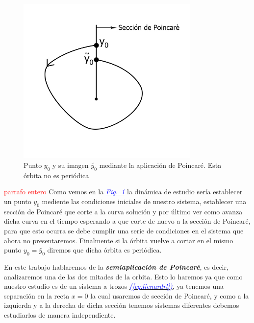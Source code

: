 \documentclass[12pt,a4paper]{report} %
\newcommand{\fref}[1]{\hyperref[#1]{\textcolor{blue}{\textit{Fig.~\ref*{#1}}}}}
\newcommand{\eref}[1]{\hyperref[#1]{\textcolor{blue}{\textit{(\ref*{#1})}}}}
\begin{document}
	\begin{figure}[h]
		\centering
		\includegraphics[width=0.8\textwidth]{aplipoincare2.jpg}
		\caption{Punto $y_0$ y su imagen $\tilde{y_0}$ mediante la aplicación de Poincaré. Esta órbita no es periódica}
		\label{fig:aplipoincare2}
	\end{figure}\smallskip
	\textcolor{red}{parrafo entero}
\noindent Como vemos en la \fref{fig:aplipoincare2} la dinámica de estudio sería establecer un punto $y_0$ mediente las condiciones iniciales de nuestro sistema, establecer una sección de Poincaré que corte a la curva solución y por último ver como avanza dicha curva en el tiempo esperando a que corte de nuevo a la sección de Poincaré, para que esto ocurra se debe cumplir una serie de condiciones en el sistema que ahora no presentaremos. Finalmente si la órbita vuelve a cortar en el mismo punto $y_0=\tilde{y_0}$ diremos que dicha órbita es periódica.
	\newpage
	
	En este trabajo hablaremos de la \textit{\textbf{semiaplicación de Poincarè}}, es decir, analizaremos una de las dos mitades de la orbita. Esto lo haremos ya que como nuestro estudio es de un sistema a trozos \eref{eq:lienardrl}, ya tenemos una separación en la recta $x=0$ la cual usaremos de sección de Poincaré, y como a la izquierda y a la derecha de dicha sección tenemos sistemas diferentes debemos estudiarlos de manera independiente.
	
\end{document}
